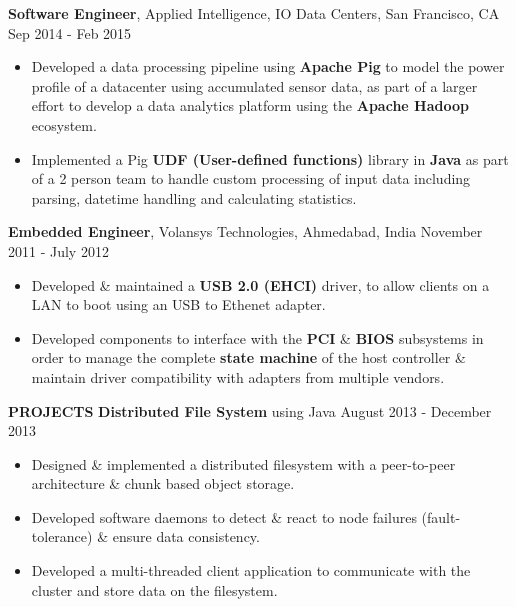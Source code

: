 \documentclass[10pt, letterpaper]{article}
\begin{document}
\textbf{Software Engineer}, Applied Intelligence, IO Data Centers, San Francisco, CA \hfill Sep 2014 - Feb 2015
\begin{itemize}
    \item Developed a data processing pipeline using \textbf{Apache Pig} to model 
the power profile of a datacenter using accumulated sensor data, as part of a larger effort to develop a data analytics
platform using the \textbf{Apache Hadoop} ecosystem.
    \item Implemented a Pig \textbf{UDF (User-defined functions)} library in \textbf{Java} as part of a 2 person team
to handle custom processing of input data including parsing, datetime handling and
calculating statistics.
\end{itemize}

\textbf{Embedded Engineer}, Volansys Technologies, Ahmedabad, India \hfill November 2011 - July 2012
\begin{itemize}
    \item Developed \& maintained a \textbf{USB 2.0 (EHCI)} driver, to allow 
clients on a LAN to boot using an USB to Ethenet adapter.
    \item Developed components to interface with the \textbf{PCI} \& \textbf{BIOS} 
subsystems in order to manage the complete \textbf{state machine} of the host controller
\& maintain driver compatibility with adapters from multiple vendors. 
\end{itemize}

\textbf{PROJECTS}
\smallskip 
\newline
\textbf{Distributed File System} using Java \hfill August 2013 - December 2013
\begin{itemize}
    \item Designed \& implemented a distributed filesystem with a peer-to-peer 
architecture \& chunk based object storage.
    \item Developed software daemons to detect \& react to node failures (fault-tolerance) \& ensure data consistency.  
    \item Developed a multi-threaded client application to communicate with the cluster and store data on the filesystem.
\end{itemize}
\end{document}
